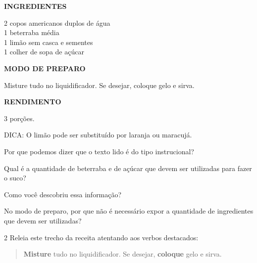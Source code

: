 \begin{escolha}
\textbf{INGREDIENTES}

2 copos americanos duplos de água\\
1 beterraba média\\
1 limão sem casca e sementes\\
1 colher de sopa de açúcar

\textbf{MODO DE PREPARO}

Misture tudo no liquidificador. Se desejar, coloque gelo e sirva.

\textbf{RENDIMENTO}

3 porções.

DICA: O limão pode ser substituído por laranja ou maracujá.


\item Por que podemos dizer que o texto lido é do tipo instrucional?


\item Qual é a quantidade de beterraba e de açúcar que devem ser utilizadas
para fazer o suco?


\item Como você descobriu essa informação?


\item No modo de preparo, por que não é necessário expor a quantidade de
ingredientes que devem ser utilizadas?


\num{2} Releia este trecho da receita atentando aos verbos destacados:

\begin{quote}
\textbf{Misture} tudo no liquidificador. Se desejar, \textbf{coloque} gelo e sirva.
\end{quote}


\end{escolha}
